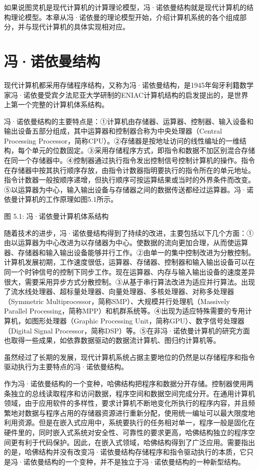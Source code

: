 \documentclass[]{ctexbook}
\begin{document}
如果说图灵机是现代计算机的计算理论模型，冯·诺依曼结构就是现代计算机的结构理论模型。本章从冯·诺依曼的理论模型开始，介绍计算机系统的各个组成部分，并与现代计算机的具体实现相对应。

\hypertarget{ux51afux8bfaux4f9dux66fcux7ed3ux6784}{%
\section{冯·诺依曼结构}\label{ux51afux8bfaux4f9dux66fcux7ed3ux6784}}

现代计算机都采用存储程序结构，又称为冯·诺依曼结构，是1945年匈牙利籍数学家冯·诺依曼受宾夕法尼亚大学研制的ENIAC计算机结构的启发提出的，是世界上第一个完整的计算机体系结构。

冯·诺依曼结构的主要特点是：①计算机由存储器、运算器、控制器、输入设备和输出设备五部分组成，其中运算器和控制器合称为中央处理器（Central Processing Processor，简称CPU）。②存储器是按地址访问的线性编址的一维结构，每个单元的位数固定。③采用存储程序方式，即指令和数据不加区别混合存储在同一个存储器中。④控制器通过执行指令发出控制信号控制计算机的操作。指令在存储器中按其执行顺序存放，由指令计数器指明要执行的指令所在的单元地址。指令计数器一般按顺序递增，但执行顺序可按运算结果或当时的外界条件而改变。⑤以运算器为中心，输入输出设备与存储器之间的数据传送都经过运算器。冯·诺依曼计算机的工作原理如图5.1所示。

图 5.1: 冯·诺依曼计算机体系结构

随着技术的进步，冯·诺依曼结构得到了持续的改进，主要包括以下几个方面：①由以运算器为中心改进为以存储器为中心。使数据的流向更加合理，从而使运算器、存储器和输入输出设备能够并行工作。②由单一的集中控制改进为分散控制。计算机发展初期，工作速度很低，运算器、存储器、控制器和输入输出设备可以在同一个时钟信号的控制下同步工作。现在运算器、内存与输入输出设备的速度差异很大，需要采用异步方式分散控制。③从基于串行算法改进为适应并行算法。出现了流水线处理器、超标量处理器、向量处理器、多核处理器、对称多处理器（Symmetric Multiprocessor，简称SMP）、大规模并行处理机（Massively Parallel Processing，简称MPP）和机群系统等。④出现为适应特殊需要的专用计算机，如图形处理器（Graphic Processing Unit，简称GPU）、数字信号处理器（Digital Signal Processor，简称DSP）等。⑤在非冯·诺依曼计算机的研究方面也取得一些成果，如依靠数据驱动的数据流计算机、图归约计算机等。

虽然经过了长期的发展，现代计算机系统占据主要地位的仍然是以存储程序和指令驱动执行为主要特点的冯·诺依曼结构。

作为冯·诺依曼结构的一个变种，哈佛结构把程序和数据分开存储。控制器使用两条独立的总线读取程序和访问数据，程序空间和数据空间完成分开。在通用计算机领域，由于应用软件的多样性，要求计算机不断地变化所执行的程序内容，并且频繁地对数据与程序占用的存储器资源进行重新分配，使用统一编址可以最大限度地利用资源。但是在嵌入式应用中，系统要执行的任务相对单一，程序一般是固化在硬件里的，同时嵌入式系统对安全性、可靠性的要求更高，哈佛结构独立的程序空间更有利于代码保护。因此，在嵌入式领域，哈佛结构得到了广泛应用。需要指出的是，哈佛结构并没有改变冯·诺依曼结构存储程序和指令驱动执行的本质，它只是冯·诺依曼结构的一个变种，并不是独立于冯·诺依曼结构的一种新型结构。
\end{document}
